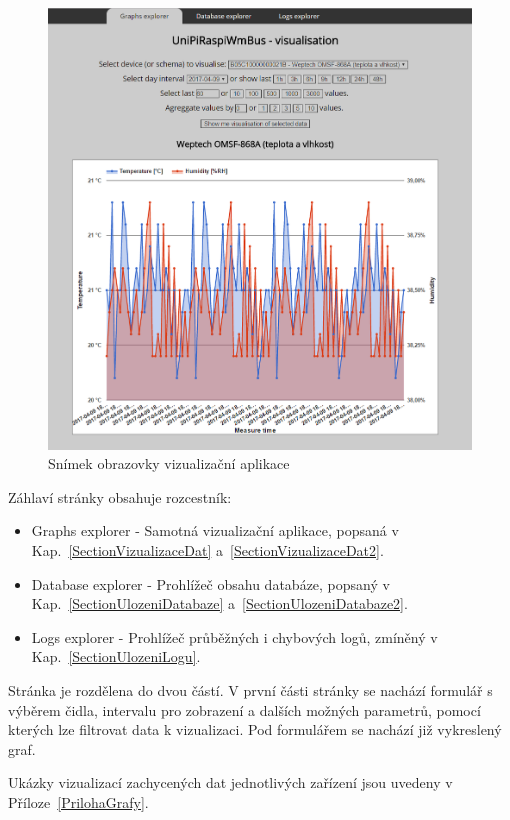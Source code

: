  \begin{figure}[!ht]
  \begin{center}
    \includegraphics[scale=0.55]{obrazky/aplikace_vizualizace}
  \end{center}
	\vspace{-10pt}
	\caption{Snímek obrazovky vizualizační aplikace}
	\label{SectionVisualizaceDat}
\end{figure}

Záhlaví stránky obsahuje rozcestník:
\begin{itemize}
	\item Graphs explorer - Samotná vizualizační aplikace, popsaná v Kap.~\ref{SectionVizualizaceDat} a~\ref{SectionVizualizaceDat2}.
	\item Database explorer - Prohlížeč obsahu databáze, popsaný v Kap.~\ref{SectionUlozeniDatabaze} a~\ref{SectionUlozeniDatabaze2}.
	\item Logs explorer - Prohlížeč průběžných i chybových logů, zmíněný v Kap.~\ref{SectionUlozeniLogu}.
\end{itemize}


 Stránka je rozdělena do dvou částí. V první části stránky se nachází formulář s výběrem čidla, intervalu pro zobrazení a dalších možných parametrů, pomocí kterých lze filtrovat data k vizualizaci. Pod formulářem se nachází již vykreslený graf.


Ukázky vizualizací zachycených dat jednotlivých zařízení jsou uvedeny v Příloze~\ref{PrilohaGrafy}.
